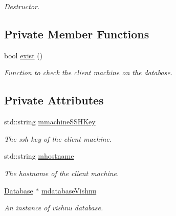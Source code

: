 \begin{DoxyCompactItemize}
\begin{DoxyCompactList}\small\item\em Destructor. \item\end{DoxyCompactList}\end{DoxyCompactItemize}
\subsection*{Private Member Functions}
\begin{DoxyCompactItemize}
\item 
bool \hyperlink{classMachineClientServer_ae31358ba9f93a020de45f2ded4573b0c}{exist} ()
\begin{DoxyCompactList}\small\item\em Function to check the client machine on the database. \item\end{DoxyCompactList}\end{DoxyCompactItemize}
\subsection*{Private Attributes}
\begin{DoxyCompactItemize}
\item 
\hypertarget{classMachineClientServer_ac6d46956262fd196c9749dd1188b9743}{
std::string \hyperlink{classMachineClientServer_ac6d46956262fd196c9749dd1188b9743}{mmachineSSHKey}}
\label{classMachineClientServer_ac6d46956262fd196c9749dd1188b9743}

\begin{DoxyCompactList}\small\item\em The ssh key of the client machine. \item\end{DoxyCompactList}\item 
\hypertarget{classMachineClientServer_a8b9f12f2f463fff6a15ca65e5942a40c}{
std::string \hyperlink{classMachineClientServer_a8b9f12f2f463fff6a15ca65e5942a40c}{mhostname}}
\label{classMachineClientServer_a8b9f12f2f463fff6a15ca65e5942a40c}

\begin{DoxyCompactList}\small\item\em The hostname of the client machine. \item\end{DoxyCompactList}\item 
\hypertarget{classMachineClientServer_a49bb6af93339f9f77423f795da452e8b}{
\hyperlink{classDatabase}{Database} $\ast$ \hyperlink{classMachineClientServer_a49bb6af93339f9f77423f795da452e8b}{mdatabaseVishnu}}
\label{classMachineClientServer_a49bb6af93339f9f77423f795da452e8b}

\begin{DoxyCompactList}\small\item\em An instance of vishnu database. \item\end{DoxyCompactList}\end{DoxyCompactItemize}


